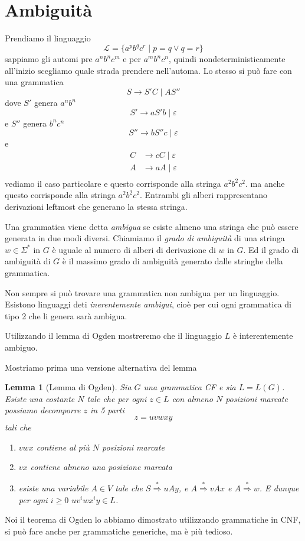 \documentclass[12pt]{article}
\newtheorem{lemma}{Lemma}
\begin{document}
\tableofcontents
\newpage
\section{Ambiguità}
Prendiamo il linguaggio
$$ \mathcal{L} = \{ a^p b^q c^r \mid p = q \vee q = r \} $$
sappiamo gli automi pre $a^n b^n c^m$ e per $a^m b^n c^n$, quindi nondeterministicamente all'inizio scegliamo quale strada prendere nell'automa.
Lo stesso si può fare con una grammatica
$$ S \rightarrow S' C \mid A S'' $$
dove $S'$ genera $a^n b^n$
$$ S' \rightarrow a S' b \mid \varepsilon $$
e $S''$ genera $b^n c^n$
$$ S'' \rightarrow b S'' c \mid \varepsilon $$
e 
\begin{align*}
	C &\rightarrow c C \mid \varepsilon \\
	A &\rightarrow a A \mid \varepsilon \\
\end{align*}
vediamo il caso particolare
e questo corrisponde alla stringa $a^2 b^2 c^2$.
ma anche questo corrisponde alla stringa $a^2 b^2 c^2$.
Entrambi gli alberi rappresentano derivazioni leftmost che generano la stessa stringa. %

Una grammatica viene detta \textit{ambigua} se esiste almeno una stringa che può essere generata in due modi diversi.
Chiamiamo il \textit{grado di ambiguità} di una stringa $w \in \Sigma^*$ in $G$ è uguale al numero di alberi di derivazione di $w$ in $G$.
Ed il grado di ambiguità di $G$ è il massimo grado di ambiguità generato dalle stringhe della grammatica.

Non sempre si può trovare una grammatica non ambigua per un linguaggio.
Esistono linguaggi deti \textit{inerentemente ambigui}, cioè per cui ogni grammatica di tipo 2 che li genera sarà ambigua.

Utilizzando il lemma di Ogden mostreremo che il linguaggio $L$ è interentemente ambiguo.

Mostriamo prima una versione alternativa del lemma
\begin{lemma}[Lemma di Ogden]
	Sia $G$ una grammatica CF e sia $L = L(G)$.
	Esiste una costante $N$ tale che per ogni $z \in L$ con almeno $N$ posizioni marcate possiamo decomporre $z$ in 5 parti
	$$ z = uvwxy $$
	tali che
	\begin{enumerate}
		\item $vwx$ contiene al più $N$ posizioni marcate
		\item $vx$ contiene almeno una posizione marcata
		\item esiste una variabile $A \in V$ tale che $S \overset{*}{\Rightarrow} uAy$, e $A \overset{*}{\Rightarrow} vAx$ e $A \overset{*}{\Rightarrow} w$.
			E dunque per ogni $i \geq 0$ $u v^i w x^i y \in L$.
	\end{enumerate}
\end{lemma}
Noi il teorema di Ogden lo abbiamo dimostrato utilizzando grammatiche in CNF, si può fare anche per grammatiche generiche, ma è più tedioso.
\end{document}

